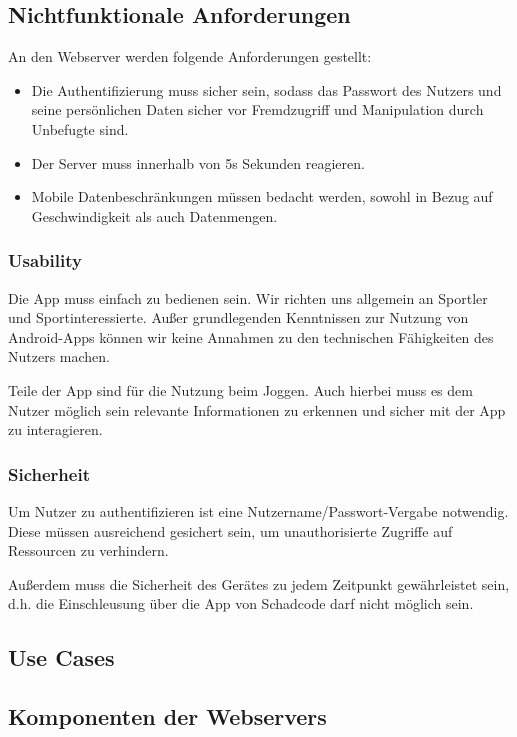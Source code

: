 \subsection{Nichtfunktionale Anforderungen}
An den Webserver werden folgende Anforderungen gestellt:
\begin{itemize}
\item Die Authentifizierung muss sicher sein, sodass das Passwort des Nutzers und seine persönlichen Daten sicher vor Fremdzugriff und Manipulation durch Unbefugte sind.
\item Der Server muss innerhalb von 5s Sekunden reagieren.
\item Mobile Datenbeschränkungen müssen bedacht werden, sowohl in Bezug auf Geschwindigkeit als auch Datenmengen.
\end{itemize}
\subsubsection{Usability}
Die App muss einfach zu bedienen sein. Wir richten uns allgemein an Sportler und Sportinteressierte. Außer grundlegenden Kenntnissen zur Nutzung von Android-Apps können wir keine Annahmen zu den technischen Fähigkeiten des Nutzers machen.

Teile der App sind für die Nutzung beim Joggen. Auch hierbei muss es dem Nutzer möglich sein relevante Informationen zu erkennen und sicher mit der App zu interagieren.

\subsubsection{Sicherheit}
Um Nutzer zu authentifizieren ist eine Nutzername/Passwort-Vergabe notwendig. Diese müssen ausreichend gesichert sein, um unauthorisierte Zugriffe auf Ressourcen zu verhindern. 

Außerdem muss die Sicherheit des Gerätes zu jedem Zeitpunkt gewährleistet sein, d.h. die Einschleusung über die App von Schadcode darf nicht möglich sein.

\subsection{Use Cases}
\subsection{Komponenten der Webservers}
